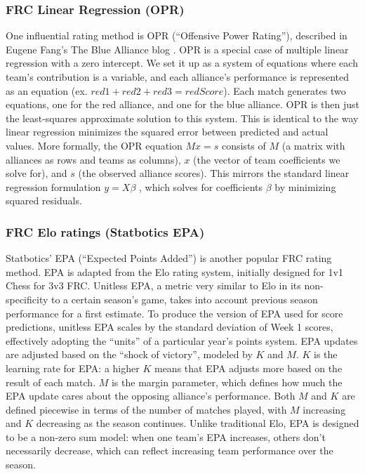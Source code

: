 \documentclass[
  12pt]{article}
\begin{document}
\subsubsection{FRC Linear Regression
(OPR)}\label{frc-linear-regression-opr}

One influential rating method is OPR (``Offensive Power Rating''),
described in Eugene Fang's The Blue Alliance blog \citep{opr_blog}. OPR
is a special case of multiple linear regression with a zero intercept.
We set it up as a system of equations where each team's contribution is
a variable, and each alliance's performance is represented as an
equation (ex. \(red1 + red2 + red3 = redScore\)). Each match generates
two equations, one for the red alliance, and one for the blue alliance.
OPR is then just the least-squares approximate solution to this system.
This is identical to the way linear regression minimizes the squared
error between predicted and actual values. More formally, the OPR
equation \(Mx = s\) consists of \(M\) (a matrix with alliances as rows
and teams as columns), \(x\) (the vector of team coefficients we solve
for), and \(s\) (the observed alliance scores). This mirrors the
standard linear regression formulation \(y = X\beta\)
\citep[sec.~3.2]{ISLR}, which solves for coefficients \(\beta\) by
minimizing squared residuals.

\subsubsection{FRC Elo ratings (Statbotics
EPA)}\label{frc-elo-ratings-statbotics-epa}

Statbotics' EPA (``Expected Points Added'') is another popular FRC
rating method. EPA \citep{epa_intro} is adapted from the Elo rating
system, initially designed for 1v1 Chess for 3v3 FRC. Unitless EPA, a
metric very similar to Elo in its non-specificity to a certain season's
game, takes into account previous season performance for a first
estimate. To produce the version of EPA used for score predictions,
unitless EPA scales by the standard deviation of Week 1 scores,
effectively adopting the ``units'' of a particular year's points system.
EPA updates are adjusted based on the ``shock of victory'', modeled by
\(K\) and \(M\). \(K\) is the learning rate for EPA: a higher \(K\)
means that EPA adjusts more based on the result of each match. \(M\) is
the margin parameter, which defines how much the EPA update cares about
the opposing alliance's performance. Both \(M\) and \(K\) are defined
piecewise in terms of the number of matches played, with \(M\)
increasing and \(K\) decreasing as the season continues. Unlike
traditional Elo, EPA is designed to be a non-zero sum model: when one
team's EPA increases, others don't necessarily decrease, which can
reflect increasing team performance over the season.
\end{document}

